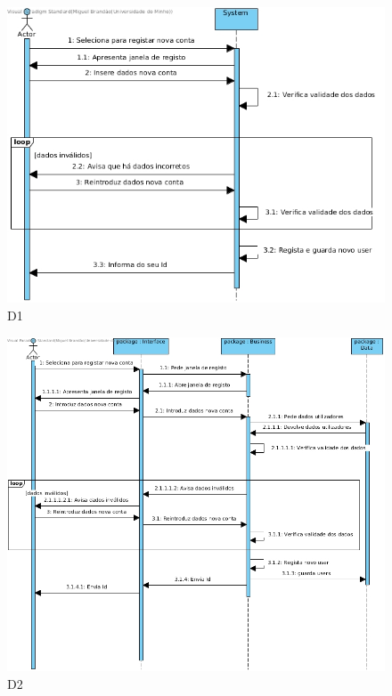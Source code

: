 \begin{figure}[H]
    \centering
    \includegraphics[width=\textwidth]{diagramas_de_sequencia/imgs/UserSystemUC3D1.jpg}
    \caption{D1}
\end{figure}
\begin{figure}[H]
    \centering
    \includegraphics[width=\textwidth]{diagramas_de_sequencia/imgs/UserSystemUC3D2.jpg}
    \caption{D2}
\end{figure}
